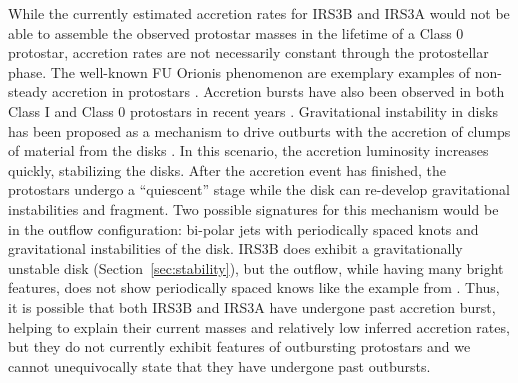 % 
% 


While the currently estimated accretion rates for IRS3B and IRS3A would not be able to assemble the observed protostar masses in the lifetime of a Class 0 protostar, accretion rates are not necessarily constant through the protostellar phase. The well-known FU Orionis phenomenon are exemplary examples of non-steady accretion in protostars \citep[e.g. ][]{1996ARAA..34..207H,2014prpl.conf..387A}. Accretion bursts have also been observed in both Class I and Class 0 protostars in recent years \citep{2015ApJ...800L...5S, 2013prpl.conf1H023F}. Gravitational instability in disks has been proposed as a mechanism to drive outburts with the accretion of clumps of material from the disks \citep{2011ASPC..451..213S, 2017MNRAS.465....2M, 2014ARep...58..522V,2014MNRAS.444..887D,2020arXiv201005939S}. In this scenario, the accretion luminosity increases quickly, stabilizing the disks. After the accretion event has finished, the protostars undergo a ``quiescent'' stage while the disk can re-develop gravitational instabilities and fragment. Two possible signatures for this mechanism would be in the outflow configuration: bi-polar jets with periodically spaced knots and gravitational instabilities of the disk. IRS3B does exhibit a gravitationally unstable disk (Section~\ref{sec:stability}), but the outflow, while having many bright features,%
does not show periodically spaced knows like the example from \citet{2015Natur.527...70P}. Thus, it is possible that both IRS3B and IRS3A have undergone past accretion burst, helping to explain their current masses and relatively low inferred accretion rates, but they do not currently exhibit features of outbursting protostars and we cannot unequivocally state that they have undergone past outbursts.
